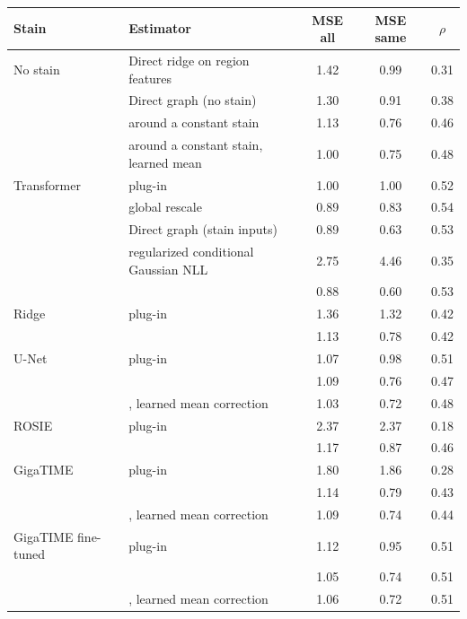 \begin{tabular}{@{}>{\raggedright\arraybackslash}p{.85in}>{\raggedright\arraybackslash}p{3.2in}ccc@{}}
\toprule
Stain & Estimator & MSE all & MSE same & $\rho$ \\
\midrule
No stain & Direct ridge on region features & 1.42 & 0.99 & 0.31 \\
 & Direct graph (no stain) & 1.30 & 0.91 & 0.38 \\
 & \method{} around a constant stain & 1.13 & 0.76 & 0.46 \\
 & \method{} around a constant stain, learned mean & 1.00 & 0.75 & 0.48 \\
\addlinespace
Transformer & plug-in & 1.00 & 1.00 & 0.52 \\
 & global rescale & 0.89 & 0.83 & 0.54 \\
 & Direct graph (stain inputs) & 0.89 & 0.63 & 0.53 \\
 & regularized conditional Gaussian NLL & 2.75 & 4.46 & 0.35 \\
 & \method{} & 0.88 & 0.60 & 0.53 \\
\addlinespace
Ridge & plug-in & 1.36 & 1.32 & 0.42 \\
 & \method{} & 1.13 & 0.78 & 0.42 \\
\addlinespace
U-Net & plug-in & 1.07 & 0.98 & 0.51 \\
 & \method{} & 1.09 & 0.76 & 0.47 \\
 & \method{}, learned mean correction & 1.03 & 0.72 & 0.48 \\
\addlinespace
ROSIE & plug-in & 2.37 & 2.37 & 0.18 \\
 & \method{} & 1.17 & 0.87 & 0.46 \\
\addlinespace
GigaTIME & plug-in & 1.80 & 1.86 & 0.28 \\
 & \method{} & 1.14 & 0.79 & 0.43 \\
 & \method{}, learned mean correction & 1.09 & 0.74 & 0.44 \\
\addlinespace
GigaTIME fine-tuned & plug-in & 1.12 & 0.95 & 0.51 \\
 & \method{} & 1.05 & 0.74 & 0.51 \\
 & \method{}, learned mean correction & 1.06 & 0.72 & 0.51 \\
\bottomrule
\end{tabular}
